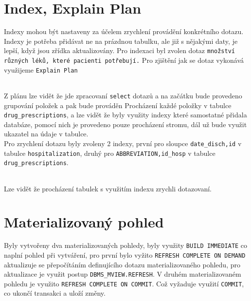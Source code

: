 \documentclass[a4paper,11pt]{article}
\begin{document}
\section{Index, Explain Plan}
Indexy mohou být nastaveny za účelem zrychlení provádění konkrétního dotazu.
Indexy je potřeba přidávat ne na prázdnou tabulku, ale již s nějakými daty, je lepší, když jsou zřídka aktualizovány.
Pro indexaci byl zvolen dotaz \texttt{množství různých léků, které pacienti potřebují.}
Pro zjištění jak se dotaz vykonává využijeme \texttt{Explain Plan}
\begin{figure}[h!]
\label{obrazek:4}
\end{figure}\\
Z plánu lze vidět že jde zpracovaní \texttt{select} dotazů a na začátku bude provedeno grupování položek a pak bude prováděn Procházení každé položky v tabulce \texttt{drug\_prescriptions}, a lze vidět že byly využity indexy které samostatné přidala databáze, pomocí nich je provedeno pouze procházení stromu, dál už bude využit ukazatel na údaje v tabulce.\\
Pro zrychlení dotazu byly zvoleny 2 indexy, první pro sloupce \texttt{date\_disch,id} v tabulce \texttt{hospitalization}, druhý pro \texttt{ABBREVIATION,id\_hosp} v tabulce \texttt{drug\_prescriptions}.\\
\begin{figure}[h!]
\label{obrazek:4}
\end{figure}\\
Lze vidět že procházení tabulek s využitím indexu zrychli dotazovaní.
\section{Materializovaný pohled}
Byly vytvořeny dva materializovaných pohledy, byly využity \texttt{BUILD IMMEDIATE} co naplní pohled při vytváření, pro první bylo vyžito \texttt{REFRESH COMPLETE ON DEMAND} aktualizuje se přepočítáním definujícího dotazu materializovaného pohledu, pro aktualizace je využit postup \texttt{DBMS\_MVIEW.REFRESH}.
V druhém materializovaném pohledu je využito \texttt{REFRESH COMPLETE ON COMMIT}. Což vyžaduje využití \texttt{COMMIT}, co ukončí transakci a
uloží změny.
\end{document}
